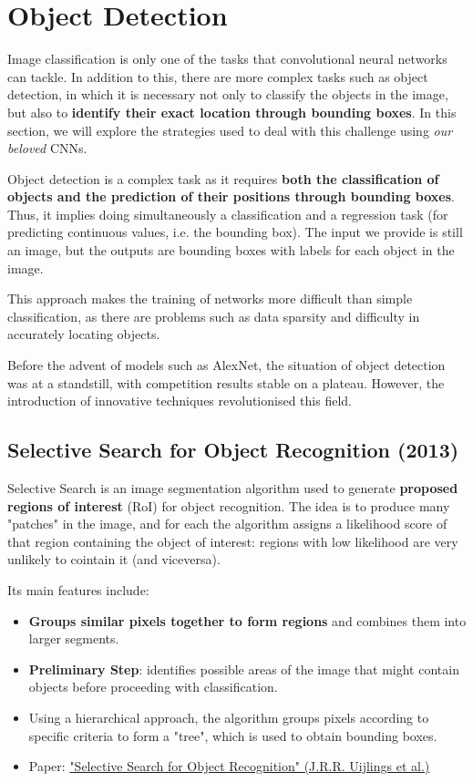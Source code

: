 \section{Object Detection}

Image classification is only one of the tasks that convolutional neural networks can tackle. In addition to this, there are more complex tasks such as object detection, in which it is necessary not only to classify the objects in the image, but also to \textbf{identify their exact location through bounding boxes}. In this section, we will explore the strategies used to deal with this challenge using \textit{our beloved} CNNs.

Object detection is a complex task as it requires \textbf{both the classification of objects and the prediction of their positions through bounding boxes}. Thus, it implies doing simultaneously a classification and a regression task (for predicting continuous values, i.e. the bounding box). The input we provide is still an image, but the outputs are bounding boxes with labels for each object in the image. 

This approach makes the training of networks more difficult than simple classification, as there are problems such as data sparsity and difficulty in accurately locating objects. 

Before the advent of models such as AlexNet, the situation of object detection was at a standstill, with competition results stable on a plateau. However, the introduction of innovative techniques revolutionised this field.

\subsection{Selective Search for Object Recognition (2013)}
Selective Search is an image segmentation algorithm used to generate \textbf{proposed regions of interest} (RoI) for object recognition. The idea is to produce many "patches" in the image, and for each the algorithm assigns a likelihood score of that region containing the object of interest: regions with low likelihood are very unlikely to cointain it (and viceversa).

Its main features include:

\begin{itemize}
    \item \textbf{Groups similar pixels together to form regions} and combines them into larger segments.
    \item \textbf{Preliminary Step}: identifies possible areas of the image that might contain objects before proceeding with classification.
    \item Using a hierarchical approach, the algorithm groups pixels according to specific criteria to form a "tree", which is used to obtain bounding boxes.
    \item Paper: \href{https://ivi.fnwi.uva.nl/isis/publications/2013/UijlingsIJCV2013/UijlingsIJCV2013.pdf}{"Selective Search for Object Recognition" (J.R.R. Uijlings et al.)}
\end{itemize}

